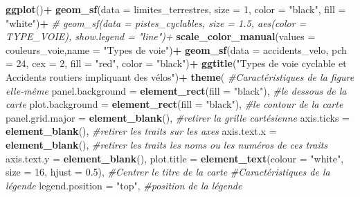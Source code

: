 \documentclass[]{article}
\newenvironment{Shaded}{\begin{snugshade}}{\end{snugshade}}
\newcommand{\KeywordTok}[1]{\textcolor[rgb]{0.13,0.29,0.53}{\textbf{#1}}}
\newcommand{\DataTypeTok}[1]{\textcolor[rgb]{0.13,0.29,0.53}{#1}}
\newcommand{\DecValTok}[1]{\textcolor[rgb]{0.00,0.00,0.81}{#1}}
\newcommand{\FloatTok}[1]{\textcolor[rgb]{0.00,0.00,0.81}{#1}}
\newcommand{\StringTok}[1]{\textcolor[rgb]{0.31,0.60,0.02}{#1}}
\newcommand{\CommentTok}[1]{\textcolor[rgb]{0.56,0.35,0.01}{\textit{#1}}}
\newcommand{\OperatorTok}[1]{\textcolor[rgb]{0.81,0.36,0.00}{\textbf{#1}}}
\newcommand{\NormalTok}[1]{#1}
\begin{document}
\begin{Shaded}
\begin{Highlighting}[]
\KeywordTok{ggplot}\NormalTok{()}\OperatorTok{+}
\StringTok{  }\KeywordTok{geom_sf}\NormalTok{(}\DataTypeTok{data =}\NormalTok{ limites_terrestres, }\DataTypeTok{size =} \DecValTok{1}\NormalTok{, }\DataTypeTok{color =} \StringTok{"black"}\NormalTok{, }\DataTypeTok{fill =} \StringTok{"white"}\NormalTok{)}\OperatorTok{+}
\StringTok{  }\CommentTok{# geom_sf(data = pistes_cyclables, size = 1.5, aes(color = TYPE_VOIE),  show.legend = "line")+}
\StringTok{  }\KeywordTok{scale_color_manual}\NormalTok{(}\DataTypeTok{values =}\NormalTok{ couleurs_voie,}\DataTypeTok{name =} \StringTok{"Types de voie"}\NormalTok{)}\OperatorTok{+}
\StringTok{  }\KeywordTok{geom_sf}\NormalTok{(}\DataTypeTok{data =}\NormalTok{ accidents_velo, }\DataTypeTok{pch =} \DecValTok{24}\NormalTok{, }\DataTypeTok{cex =} \DecValTok{2}\NormalTok{, }\DataTypeTok{fill =} \StringTok{"red"}\NormalTok{, }\DataTypeTok{color =} \StringTok{"black"}\NormalTok{)}\OperatorTok{+}
\StringTok{  }\KeywordTok{ggtitle}\NormalTok{(}\StringTok{"Types de voie cyclable et Accidents routiers impliquant des vélos"}\NormalTok{)}\OperatorTok{+}
\KeywordTok{theme}\NormalTok{(}
      \CommentTok{#Caractéristiques de la figure elle-même}
      \DataTypeTok{panel.background =} \KeywordTok{element_rect}\NormalTok{(}\DataTypeTok{fill =} \StringTok{"black"}\NormalTok{), }\CommentTok{#le dessous de la carte}
      \DataTypeTok{plot.background =} \KeywordTok{element_rect}\NormalTok{(}\DataTypeTok{fill =} \StringTok{"black"}\NormalTok{),  }\CommentTok{#le contour de la carte}
      \DataTypeTok{panel.grid.major =} \KeywordTok{element_blank}\NormalTok{(),              }\CommentTok{#retirer la grille cartésienne}
      \DataTypeTok{axis.ticks =} \KeywordTok{element_blank}\NormalTok{(),                    }\CommentTok{#retirer les traits sur les axes}
      \DataTypeTok{axis.text.x =} \KeywordTok{element_blank}\NormalTok{(),                   }\CommentTok{#retirer les traits les noms ou les numéros de ces traits}
      \DataTypeTok{axis.text.y =} \KeywordTok{element_blank}\NormalTok{(),}
      \DataTypeTok{plot.title =} \KeywordTok{element_text}\NormalTok{(}\DataTypeTok{colour =} \StringTok{"white"}\NormalTok{, }\DataTypeTok{size =} \DecValTok{16}\NormalTok{, }\DataTypeTok{hjust =} \FloatTok{0.5}\NormalTok{), }\CommentTok{#Centrer le titre de la carte}
      \CommentTok{#Caractéristiques de la légende}
      \DataTypeTok{legend.position =} \StringTok{"top"}\NormalTok{,                         }\CommentTok{#position de la légende}

\end{Highlighting}
\end{Shaded}
\end{document}
